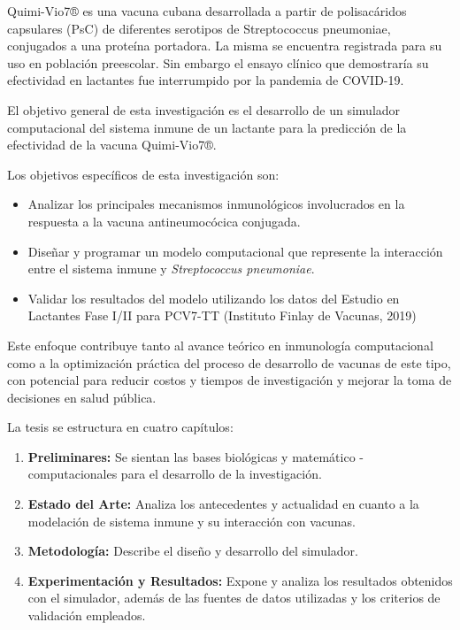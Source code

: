 Quimi-Vio7® es una vacuna cubana desarrollada a partir de polisacáridos capsulares (PsC) de diferentes serotipos de Streptococcus pneumoniae, conjugados a una proteína portadora. 
La misma se encuentra registrada para su uso en población preescolar. Sin embargo el ensayo clínico que demostraría su efectividad en lactantes fue interrumpido por la pandemia de COVID-19.


\vspace{0.5cm}

El objetivo general de esta investigación es el desarrollo de un simulador computacional del sistema inmune de un lactante para la predicción de la efectividad de la vacuna Quimi-Vio7®.

Los objetivos específicos de esta investigación son:
\begin{itemize}
    \item Analizar los principales mecanismos inmunológicos involucrados en la respuesta a la vacuna antineumocócica conjugada.
    \item Diseñar y programar un modelo computacional que represente la interacción entre el sistema inmune y \textit{Streptococcus pneumoniae}.
    
    \item Validar los resultados del modelo utilizando los datos del Estudio en Lactantes Fase I/II para PCV7-TT (Instituto Finlay de Vacunas, 2019)
\end{itemize}

Este enfoque contribuye tanto al avance teórico en inmunología computacional como a la optimización práctica del proceso de desarrollo de vacunas de este tipo, con potencial para reducir costos y tiempos de investigación y mejorar la toma de decisiones en salud pública.



\vspace{0.5cm}

La tesis se estructura en cuatro capítulos:
\begin{enumerate}
    \item \textbf{Preliminares:} Se sientan las bases biológicas y matemático - computacionales para el desarrollo de la investigación.
    \item \textbf{Estado del Arte:} Analiza los antecedentes y actualidad en cuanto a la modelación de sistema inmune y su interacción con vacunas.
    
    \item \textbf{Metodología:} Describe el diseño y desarrollo del simulador.
    \item \textbf{Experimentación y Resultados:} Expone y analiza los resultados obtenidos con el simulador, además de las fuentes de datos utilizadas y los criterios de validación empleados.
\end{enumerate}